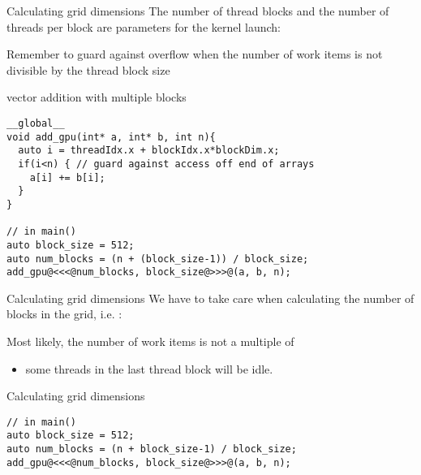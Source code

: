 \documentclass[aspectratio=43]{beamer}
\begin{document}
\begin{frame}[fragile]{Calculating grid dimensions}
            The number of thread blocks and the number of threads per block are parameters for the kernel launch:
            \begin{center}
            \end{center}
            Remember to guard against overflow when the number of work items is not divisible by the thread block size

    \begin{code}{vector addition with multiple blocks}
        \begin{lstlisting}[style=boxcudatiny]
__global__
void add_gpu(int* a, int* b, int n){
  auto i = threadIdx.x + blockIdx.x*blockDim.x;
  if(i<n) { // guard against access off end of arrays
    a[i] += b[i];
  }
}

// in main()
auto block_size = 512;
auto num_blocks = (n + (block_size-1)) / block_size;
add_gpu@<<<@num_blocks, block_size@>>>@(a, b, n);
        \end{lstlisting}
    \end{code}
\end{frame}

\begin{frame}[fragile]{Calculating grid dimensions}
        We have to take care when calculating the number of blocks in the grid, i.e. :
        \begin{center}
        \end{center}
        Most likely, the number of work items  is not a multiple of 
        \begin{itemize}
            \item some threads in the last thread block will be idle.
        \end{itemize}

    \begin{code}{Calculating grid dimensions}
        \begin{lstlisting}[style=boxcudatiny]
// in main()
auto block_size = 512;
auto num_blocks = (n + block_size-1) / block_size;
add_gpu@<<<@num_blocks, block_size@>>>@(a, b, n);
        \end{lstlisting}
    \end{code}
\end{frame}
\end{document}
